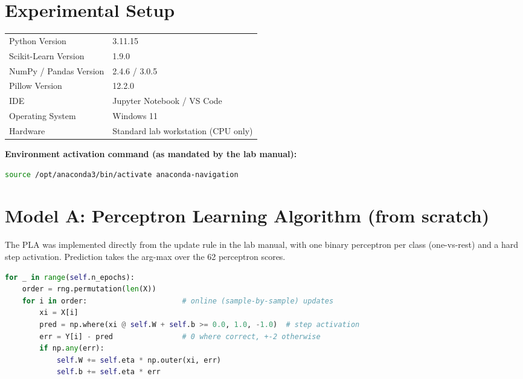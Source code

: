 \documentclass[12pt,a4paper]{article}
\newenvironment{fitwidth}
  {\begin{lrbox}{\fitbox}}
  {\end{lrbox}\ifdim\wd\fitbox>\linewidth\resizebox{\linewidth}{!}{\usebox{\fitbox}}\else\usebox{\fitbox}\fi}
\DeclareRobustCommand{\_}{\textunderscore\allowbreak}
\begin{document}
\section{Experimental Setup}
\begin{center}
\begin{minipage}{\linewidth}\centering
\begin{fitwidth}
\begin{tabular}{ll}
\toprule
Python Version & 3.11.15 \\
Scikit-Learn Version & 1.9.0 \\
NumPy / Pandas Version & 2.4.6 / 3.0.5 \\
Pillow Version & 12.2.0 \\
IDE & Jupyter Notebook / VS Code \\
Operating System & Windows 11 \\
Hardware & Standard lab workstation (CPU only) \\
\bottomrule
\end{tabular}
\end{fitwidth}
\end{minipage}
\end{center}

\vspace{0.3cm}
\textbf{Environment activation command (as mandated by the lab manual):}
\begin{lstlisting}[language=bash]
source /opt/anaconda3/bin/activate anaconda-navigation
\end{lstlisting}

\section{Model A: Perceptron Learning Algorithm (from scratch)}
\label{sec:pla}

The PLA was implemented directly from the update rule in the lab manual, with
one binary perceptron per class (one-vs-rest) and a hard step activation.
Prediction takes the arg-max over the 62 perceptron scores.

\begin{lstlisting}[language=Python, caption={Core of the from-scratch PLA, from \texttt{experiment9\_pla\_vs\_mlp.py}.}]
for _ in range(self.n_epochs):
    order = rng.permutation(len(X))
    for i in order:                      # online (sample-by-sample) updates
        xi = X[i]
        pred = np.where(xi @ self.W + self.b >= 0.0, 1.0, -1.0)  # step activation
        err = Y[i] - pred                # 0 where correct, +-2 otherwise
        if np.any(err):
            self.W += self.eta * np.outer(xi, err)
            self.b += self.eta * err
\end{lstlisting}
\end{document}

